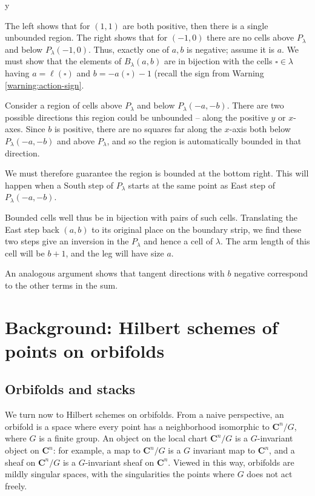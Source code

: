 y\documentclass{amsart}[12pt]
\theoremstyle{definition}
\newcommand{\C}{\mathbf{C}}
\begin{document}
The left shows that for $(1,1)$ are both positive, then there is a single unbounded region.  The right shows that for $(-1,0)$ there are no cells above $P_\lambda$ and below $P_\lambda(-1,0)$.
Thus, exactly one of $a,b$ is negative; assume it is $a$.  We must show that the elements of $B_\lambda(a,b)$ are in bijection with the cells $\square\in\lambda$ having  $a=\ell(\square)$ and $b=-a(\square)-1$ (recall the sign from Warning \ref{warning:action-sign}.

Consider a region of cells above $P_\lambda$ and below $P_\lambda(-a,-b)$.  There are two possible directions this region could be unbounded -- along the positive $y$ or $x$-axes.  Since $b$ is positive, there are no squares far along the $x$-axis both below $P_\lambda(-a,-b)$  and above $P_\lambda$, and so the region is automatically bounded in that direction.  

We must therefore guarantee the region is bounded at the bottom right.  This will happen when a South step of $P_\lambda$ starts at the same point as East step of $P_\lambda(-a,-b)$.  




Bounded cells well thus be in bijection with pairs of such cells.  Translating the East step back $(a,b)$ to its original place on the boundary strip, we find these two steps give an inversion in the $P_\lambda$ and hence a cell of $\lambda$.  The arm length of this cell will be $b+1$, and the leg will have size $a$. 

An analogous argument shows that tangent directions with $b$ negative correspond to the other terms in the sum.




\section{Background: Hilbert schemes of points on orbifolds}


\subsection{Orbifolds and stacks}
We turn now to Hilbert schemes on orbifolds.  From a naive perspective, an orbifold is a space where every point has a neighborhood isomorphic to $\C^n/G$, where $G$ is a finite group.  An object on the local chart $\C^n/G$ is a $G$-invariant object on $\C^n$: for example, a map to $\C^n/G$ is a $G$ invariant map to $\C^n$, and a sheaf on $\C^n/G$ is a $G$-invariant sheaf on $\C^n$.  Viewed in this way, orbifolds are mildly singular spaces, with the singularities the points where $G$ does not act freely.
\end{document}
